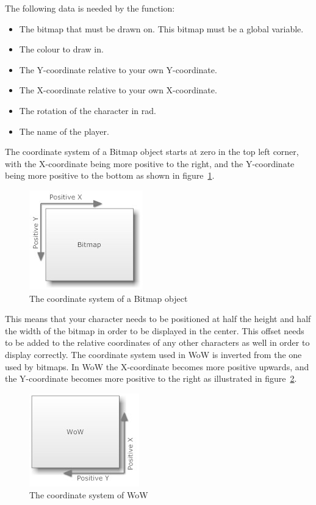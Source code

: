 The following data is needed by the function:

\begin{itemize}
	\item The bitmap that must be drawn on. This bitmap must be a global variable.
	\item The colour to draw in.
	\item The Y-coordinate relative to your own Y-coordinate.
	\item The X-coordinate relative to your own X-coordinate.
	\item The rotation of the character in rad.
	\item The name of the player.
\end{itemize}

The coordinate system of a Bitmap object starts at zero in the top left corner, with the X-coordinate being more positive to the right, and the Y-coordinate being more positive to the bottom as shown in figure~\ref{bitmap}.

\begin{figure}[htbp]  
\centering
\includegraphics[scale = 0.65]{bitmap.jpg}	
\caption{The coordinate system of a Bitmap object}
\label{bitmap}
\end{figure}

This means that your character needs to be positioned at half the height and half the width of the bitmap in order to be displayed in the center. This offset needs to be added to the relative coordinates of any other characters as well in order to display correctly. The coordinate system used in WoW is inverted from the one used by bitmaps. In WoW the X-coordinate becomes more positive upwards, and the Y-coordinate becomes more positive to the right as illustrated in figure~\ref{wowcoord}.

\begin{figure}[htbp]  
\centering
\includegraphics[scale = 0.65]{wowcoord.jpg}	
\caption{The coordinate system of WoW}
\label{wowcoord}
\end{figure}

